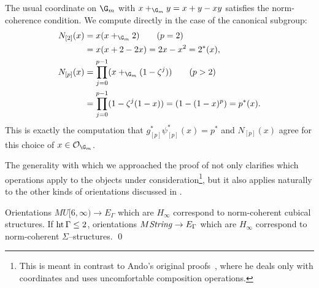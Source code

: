 \begin{example}
The usual coordinate on \(\G_m\) with \(x +_{\G_m} y = x + y - xy\) satisfies the norm-coherence condition.  We compute directly in the case of the canonical subgroup:
\begin{align*}
N_{[2]}(x) & = x(x +_{\G_m} 2) \tag{\(p = 2\)} \\
& = x (x + 2 - 2x) = 2x - x^2 = 2^*(x), \\
N_{[p]}(x) & = \prod_{j=0}^{p-1} (x +_{\G_m} (1 - \zeta^j)) \tag{\(p > 2\)} \\
& = \prod_{j=0}^{p-1} (1 - \zeta^j(1 - x)) = (1 - (1 - x)^p) = p^*(x).
\end{align*}
This is exactly the computation that \(g_{[p]}^* \psi_{[p]}^*(x) = p^*\) and \(N_{[p]}(x)\) agree for this choice of \(x \in \sheaf O_{\G_m}\).
\end{example}

The generality with which we approached the proof of  not only clarifies which operations apply to the objects under consideration\footnote{This is meant in contrast to Ando's original proofs~\cite[Section 2.6]{Ando}, where he deals only with coordinates and uses uncomfortable composition operations.}, but it also applies naturally to the other kinds of orientations discussed in .

\begin{theorem}
Orientations \(MU[6, \infty) \to E_\Gamma\) which are \(H_\infty\) correspond to norm-coherent cubical structures.  If \(\operatorname{ht}{\Gamma} \le 2\), orientations \(M\mathit{String} \to E_\Gamma\) which are \(H_\infty\) correspond to norm-coherent \(\Sigma\)--structures. \qed
\end{theorem}

